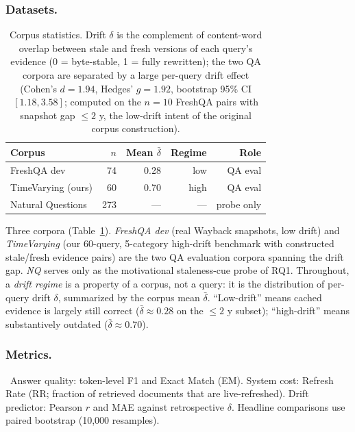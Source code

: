 \documentclass[pdflatex,sn-basic]{sn-jnl}
\begin{document}
\subsubsection*{Datasets.}
\begin{table}[htbp]
\caption{Corpus statistics. Drift $\delta$ is the complement of content-word overlap between stale and fresh versions of each query's evidence (0 = byte-stable, 1 = fully rewritten); the two QA corpora are separated by a large per-query drift effect (Cohen's $d{=}1.94$, Hedges' $g{=}1.92$, bootstrap 95\% CI $[1.18, 3.58]$; computed on the $n{=}10$ FreshQA pairs with snapshot gap $\le 2$ y, the low-drift intent of the original corpus construction).}
\label{tab:datasets}
\centering
\begin{tabular}{lrrrr}
\toprule
Corpus & $n$ & Mean $\bar\delta$ & Regime & Role \\
\midrule
FreshQA dev~\cite{vu2023freshqa} & 74 & 0.28\footnotemark[1] & low & QA eval \\
TimeVarying (ours) & 60 & 0.70 & high & QA eval \\
Natural Questions~\cite{kwiatkowski2019nq} & 273 & --- & --- & probe only \\
\bottomrule
\end{tabular}
\end{table}
Three corpora (Table~\ref{tab:datasets}). \emph{FreshQA dev} (real Wayback snapshots, low drift) and \emph{TimeVarying} (our 60-query, 5-category high-drift benchmark with constructed stale/fresh evidence pairs) are the two QA evaluation corpora spanning the drift gap. \emph{NQ} serves only as the motivational staleness-cue probe of RQ1. Throughout, a \emph{drift regime} is a property of a corpus, not a query: it is the distribution of per-query drift $\delta$, summarized by the corpus mean $\bar\delta$. ``Low-drift'' means cached evidence is largely still correct ($\bar\delta{\approx}0.28$ on the $\le 2$ y subset); ``high-drift'' means substantively outdated ($\bar\delta{\approx}0.70$).

\subsubsection*{Metrics.}~Answer quality: token-level F1 and Exact Match (EM). System cost: Refresh Rate (RR; fraction of retrieved documents that are live-refreshed). Drift predictor: Pearson $r$ and MAE against retrospective $\delta$. Headline comparisons use paired bootstrap (10,000 resamples).
\end{document}
